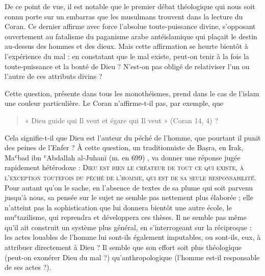 De ce point de vue, il est notable que le premier débat théologique qui
nous soit connu porte sur un embarras que les musulmans trouvent dans la
lecture du Coran. Ce dernier affirme avec force l'absolue
toute-puissance divine, s'opposant ouvertement au fatalisme du paganisme
arabe antéislamique qui plaçait le destin au-dessus des hommes et des
dieux. Mais cette affirmation se heurte bientôt à l'expérience du mal :
en constatant que le mal existe, peut-on tenir à la fois la
toute-puissance et la bonté de Dieu ? N'est-on pas obligé de relativiser
l'un ou l'autre de ces attributs divins ?

Cette question, présente dans tous les monothéismes, prend dans le cas
de l'islam une couleur particulière. Le Coran n'affirme-t-il pas, par
exemple, que
\begin{quote}
    « Dieu guide qui Il veut et égare qui Il veut » (Coran 14,
4) ?
\end{quote} 
Cela signifie-t-il que Dieu est l'auteur du péché de l'homme, que
pourtant il punit des peines de l'Enfer ? À cette question, un
traditionniste de Baṣra, en Irak, Maʿbad ibn ʿAbdallah al-Juhanī (m. en
699) , va donner une réponse jugée rapidement hétérodoxe : \textsc{Dieu est bien
le créateur de tout ce qui existe, à l'exception toutefois du péché de
l'homme, qui est de sa seule responsabilité.} Pour autant qu'on le sache,
en l'absence de textes de sa plume qui soit parvenu jusqu'à nous, sa
pensée sur le sujet ne semble pas nettement plus élaborée ; elle
n'atteint pas la sophistication que lui donnera bientôt une autre école,
le muʿtazilisme, qui reprendra et développera ces thèses. Il ne semble
pas même qu'il ait construit un système plus général, en s'interrogeant
sur la réciproque : les actes
louables de l'homme lui sont-ils également imputables, ou sont-ils, eux,
à attribuer directement à Dieu ? Il semble que son effort soit plus
théologique (peut-on exonérer Dieu du mal ?) qu'anthropologique (l'homme
est-il responsable de ses actes ?).


